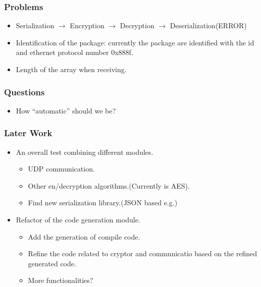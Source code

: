 \documentclass[11pt]{beamer}
\begin{document}
\begin{frame}
\begin{multicols}{2}
\end{multicols}
\end{frame}

\begin{frame}\frametitle{Problems}
\begin{itemize}
\item Serialization $\rightarrow$ Encryption $\rightarrow$ Decryption $\rightarrow$ Deserialization(ERROR)

\item Identification of the package: currently the package are identified with the  id and ethernet protocol number 0x888f.

\item Length of the array when receiving.
\end{itemize}
\end{frame}

\begin{frame}\frametitle{Questions}
\begin{itemize}
\item How ``automatic'' should we be?

\end{itemize}
\end{frame}

\begin{frame}\frametitle{Later Work}
\begin{itemize}
\item An overall test combining different modules.
\begin{itemize}
\item UDP communication.
\item Other en/decryption algorithms.(Currently is AES).

\item Find new serialization library.(JSON based e.g.)
\end{itemize}

\item Refactor of the code generation module.
\begin{itemize}
\item Add the generation of compile code.
\item Refine the code related to cryptor and communicatio based on the refined generated code.
\item More functionalities?
\end{itemize}
\end{itemize}
\end{frame}
\end{document}
